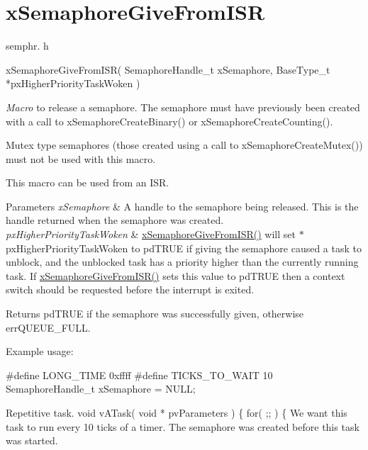 \hypertarget{group__xSemaphoreGiveFromISR}{\section{x\-Semaphore\-Give\-From\-I\-S\-R}
\label{group__xSemaphoreGiveFromISR}
}
semphr. h 
\begin{DoxyPre}
 xSemaphoreGiveFromISR(
                          SemaphoreHandle\_t xSemaphore,
                          BaseType\_t *pxHigherPriorityTaskWoken
                      )\end{DoxyPre}


{\itshape Macro} to release a semaphore. The semaphore must have previously been created with a call to x\-Semaphore\-Create\-Binary() or x\-Semaphore\-Create\-Counting().

Mutex type semaphores (those created using a call to x\-Semaphore\-Create\-Mutex()) must not be used with this macro.

This macro can be used from an I\-S\-R.


\begin{DoxyParams}{Parameters}
{\em x\-Semaphore} & A handle to the semaphore being released. This is the handle returned when the semaphore was created.\\
\hline
{\em px\-Higher\-Priority\-Task\-Woken} & \hyperlink{semphr_8h_a68aa43df8b2a0dbe17d05fad74670ef0}{x\-Semaphore\-Give\-From\-I\-S\-R()} will set $\ast$px\-Higher\-Priority\-Task\-Woken to pd\-T\-R\-U\-E if giving the semaphore caused a task to unblock, and the unblocked task has a priority higher than the currently running task. If \hyperlink{semphr_8h_a68aa43df8b2a0dbe17d05fad74670ef0}{x\-Semaphore\-Give\-From\-I\-S\-R()} sets this value to pd\-T\-R\-U\-E then a context switch should be requested before the interrupt is exited.\\
\hline
\end{DoxyParams}
\begin{DoxyReturn}{Returns}
pd\-T\-R\-U\-E if the semaphore was successfully given, otherwise err\-Q\-U\-E\-U\-E\-\_\-\-F\-U\-L\-L.
\end{DoxyReturn}
Example usage\-: 
\begin{DoxyPre}
 \#define LONG\_TIME 0xffff
 \#define TICKS\_TO\_WAIT 10
 SemaphoreHandle\_t xSemaphore = NULL;\end{DoxyPre}



\begin{DoxyPre}Repetitive task.
 void vATask( void * pvParameters )
 \{
    for( ;; )
    \{
We want this task to run every 10 ticks of a timer.  The semaphore
was created before this task was started.\end{DoxyPre}



